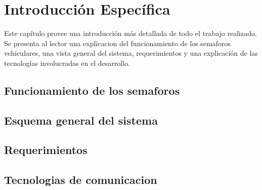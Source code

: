 \chapter{Introducción Específica} %

\label{Chapter2}


Este capítulo provee una introducción más detallada de todo el trabajo realizado.
Se presenta al lector una explicacion del funcionamiento  de los semaforos vehiculares, una vista general del sistema, requerimientos y una explicación de las tecnologías involucradas en el desarrollo.

\section{Funcionamiento de los semaforos}

\section{Esquema general del sistema}

\section{Requerimientos}

\section{Tecnologias de comunicacion}